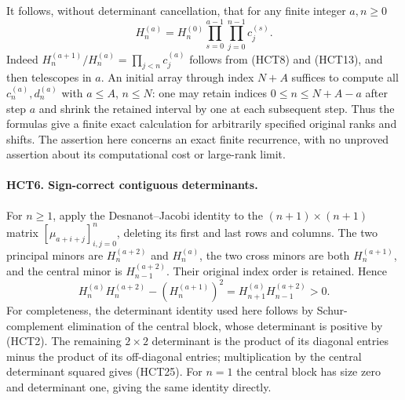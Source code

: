 \documentclass[11pt,a4paper]{article}
\begin{document}
It follows, without determinant cancellation, that for any finite
integer $a,n\geq0$
\begin{equation}\tag{HCT24}
 H_n^{(a)}=H_n^{(0)}
 \prod_{s=0}^{a-1}\prod_{j=0}^{n-1}c_j^{(s)}.
\end{equation}
Indeed $H_n^{(a+1)}/H_n^{(a)}=\prod_{j<n}c_j^{(a)}$ follows
from (HCT8) and (HCT13), and then telescopes in $a$.
An initial array through index $N+A$ suffices to compute all
$c_n^{(a)},d_n^{(a)}$ with $a\leq A$, $n\leq N$: one may
retain indices $0\leq n\leq N+A-a$ after step $a$ and shrink
the retained interval by one at each subsequent step.
Thus the formulas give a finite exact calculation for arbitrarily
specified original ranks and shifts. The assertion here concerns
an exact finite recurrence, with no unproved assertion about its
computational cost or large-rank limit.

\paragraph{HCT6. Sign-correct contiguous determinants.}
For $n\geq1$, apply the Desnanot--Jacobi identity to the
$(n+1)\times(n+1)$ matrix $[\mu_{a+i+j}]_{i,j=0}^{n}$,
deleting its first and last rows and columns. The two principal
minors are $H_n^{(a+2)}$ and $H_n^{(a)}$, the two cross minors
are both $H_n^{(a+1)}$, and the central minor is
$H_{n-1}^{(a+2)}$. Their original index order is retained. Hence
\begin{equation}\tag{HCT25}
 H_n^{(a)}H_n^{(a+2)}-(H_n^{(a+1)})^2
 =H_{n+1}^{(a)}H_{n-1}^{(a+2)}>0.
\end{equation}
For completeness, the determinant identity used here follows by
Schur-complement elimination of the central block, whose determinant
is positive by (HCT2). The remaining $2\times2$ determinant is
the product of its diagonal entries minus the product of its
off-diagonal entries; multiplication by the central determinant
squared gives (HCT25). For $n=1$ the central block has size zero
and determinant one, giving the same identity directly.
\end{document}
